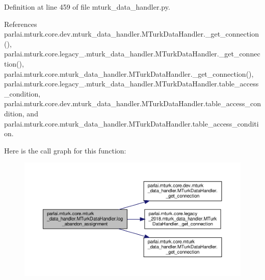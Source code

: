 Definition at line 459 of file mturk\+\_\+data\+\_\+handler.\+py.



References parlai.\+mturk.\+core.\+dev.\+mturk\+\_\+data\+\_\+handler.\+M\+Turk\+Data\+Handler.\+\_\+get\+\_\+connection(), parlai.\+mturk.\+core.\+legacy\+\_.\+mturk\+\_\+data\+\_\+handler.\+M\+Turk\+Data\+Handler.\+\_\+get\+\_\+connection(), parlai.\+mturk.\+core.\+mturk\+\_\+data\+\_\+handler.\+M\+Turk\+Data\+Handler.\+\_\+get\+\_\+connection(), parlai.\+mturk.\+core.\+legacy\+\_.\+mturk\+\_\+data\+\_\+handler.\+M\+Turk\+Data\+Handler.\+table\+\_\+access\+\_\+condition, parlai.\+mturk.\+core.\+dev.\+mturk\+\_\+data\+\_\+handler.\+M\+Turk\+Data\+Handler.\+table\+\_\+access\+\_\+condition, and parlai.\+mturk.\+core.\+mturk\+\_\+data\+\_\+handler.\+M\+Turk\+Data\+Handler.\+table\+\_\+access\+\_\+condition.

Here is the call graph for this function\+:
\nopagebreak
\begin{figure}[H]
\begin{center}
\leavevmode
\includegraphics[width=350pt]{classparlai_1_1mturk_1_1core_1_1mturk__data__handler_1_1MTurkDataHandler_ab4a4d10fa1923efc5dfdcf2e451c816f_cgraph}
\end{center}
\end{figure}
\mbox{\label{classparlai_1_1mturk_1_1core_1_1mturk__data__handler_1_1MTurkDataHandler_adfbc9d075e9c0ffe22fc203676ad0a77}} 

